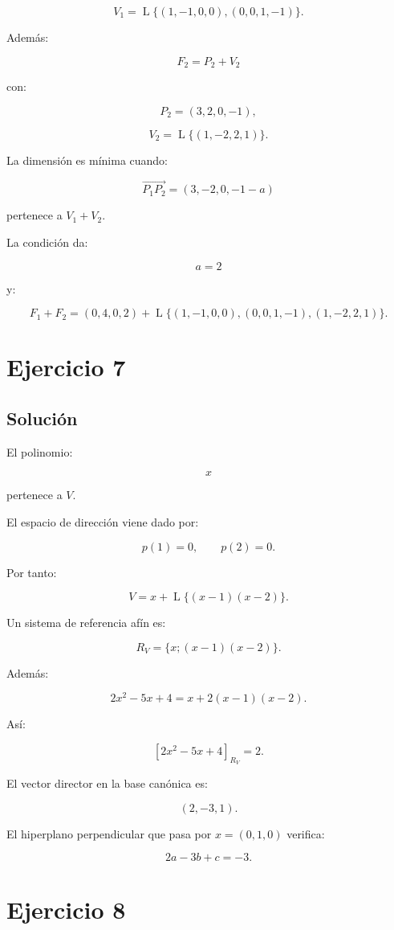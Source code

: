 \documentclass[11pt,a4paper]{article}
\newcommand{\Span}{\operatorname{L}}
\begin{document}
\[
V_1=
\Span\{(1,-1,0,0),(0,0,1,-1)\}.
\]

Además:

\[
F_2=P_2+V_2
\]

con:

\[
P_2=(3,2,0,-1),
\]

\[
V_2=\Span\{(1,-2,2,1)\}.
\]

La dimensión es mínima cuando:

\[
\overrightarrow{P_1P_2}
=
(3,-2,0,-1-a)
\]

pertenece a $V_1+V_2$.

La condición da:

\[
\boxed{a=2}
\]

y:

\[
\boxed{
F_1+F_2
=
(0,4,0,2)
+
\Span\{(1,-1,0,0),(0,0,1,-1),(1,-2,2,1)\}.
}
\]

\section{Ejercicio 7}
\subsection{Solución}

El polinomio:

\[
x
\]

pertenece a $V$.

El espacio de dirección viene dado por:

\[
p(1)=0,
\qquad
p(2)=0.
\]

Por tanto:

\[
\boxed{
V=x+\Span\{(x-1)(x-2)\}.
}
\]

Un sistema de referencia afín es:

\[
\boxed{
R_V=\{x;(x-1)(x-2)\}.
}
\]

Además:

\[
2x^2-5x+4
=
x+2(x-1)(x-2).
\]

Así:

\[
\boxed{
[2x^2-5x+4]_{R_V}=2.
}
\]

El vector director en la base canónica es:

\[
(2,-3,1).
\]

El hiperplano perpendicular que pasa por $x=(0,1,0)$ verifica:

\[
\boxed{
2a-3b+c=-3.
}
\]

\section{Ejercicio 8}
\end{document}
